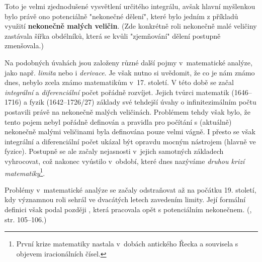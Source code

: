 Toto je velmi zjednodušené vysvětlení určitého integrálu, avšak hlavní myšlenkou bylo právě ono potenciálně "nekonečné dělení", které bylo jedním z příkladů využití \textbf{nekonečně malých veličin}. (Zde konkrétně roli nekonečně malé veličiny zastávala šířka obdélníků, která se kvůli "zjemňování" dělení postupně zmenšovala.)\par
Na podobných úvahách jsou založeny různé další pojmy v~matematické analýze, jako např. \emph{limita} nebo i \emph{derivace}. Je však nutno si uvědomit, že co je nám známo dnes, nebylo zcela známo matematikům v~17. století. V této době se začal \emph{integrální} a \emph{diferenciální} počet pořádně rozvíjet. Jejich tvůrci matematik  (1646--1716) a fyzik  (1642--1726/27) základy své tehdejší úvahy o infinitezimálním počtu postavili právě na nekonečně malých veličinách. Problémem tehdy však bylo, že tento pojem nebyl pořádně definován a pravidla pro počítání s (aktuálně) nekonečně malými veličinami byla definována pouze velmi vágně. I přesto se však integrální a diferenciální počet ukázal být opravdu mocným nástrojem (hlavně ve fyzice). Postupně se ale začaly nejasnosti v~jejich samotných základech vyhrocovat, což nakonec vyústilo v~období, které dnes nazýváme \emph{druhou krizí matematiky}\footnote{První krize matematiky nastala v~dobách antického Řecka a souvisela s objevem iracionálních čísel.}.\par
Problémy v~matematické analýze se začaly odstraňovat až na počátku 19. století, kdy významnou roli sehrál ve dvacátých letech  zavedením limity. Její formální definici však podal později , která pracovala opět s potenciálním nekonečnem. (\cite{Fuchs2003}, str. 105--106.)